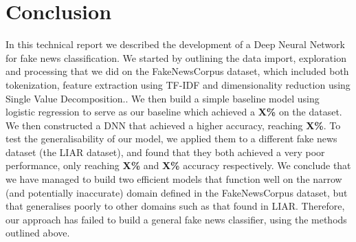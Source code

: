 \section{Conclusion}
In this technical report we described the development of a Deep Neural Network for fake news classification. We started
by outlining the data import, exploration and processing that we did on the FakeNewsCorpus dataset, which included both
tokenization, feature extraction using TF-IDF and dimensionality reduction using Single Value Decomposition.. We then build a
simple baseline model using logistic regression to serve as our baseline which achieved a \textbf{X\%} on the dataset.
We then constructed a DNN that achieved a higher accuracy, reaching \textbf{X\%}. To test the generalisability of our
model, we applied them to a different fake news dataset (the LIAR dataset), and found that they both achieved a very
poor performance, only reaching \textbf{X\%} and \textbf{X\%} accuracy respectively. We conclude that we have managed
to build two efficient models that function well on the narrow (and potentially inaccurate) domain defined in the
FakeNewsCorpus dataset, but that generalises poorly to other domains such as that found in LIAR. Therefore, our
approach has failed to build a general fake news classifier, using the methods outlined above.
